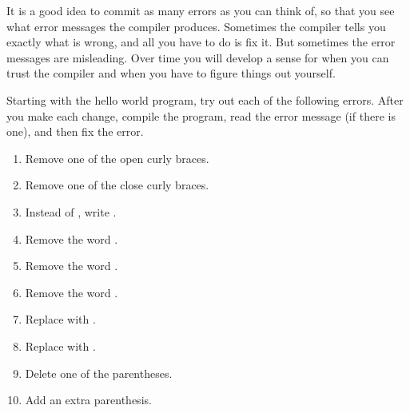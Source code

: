 \begin{exercise}  %

It is a good idea to commit as many errors as you can think of, so that you see what error messages the compiler produces.
Sometimes the compiler tells you exactly what is wrong, and all you have to do is fix it.
But sometimes the error messages are misleading.
Over time you will develop a sense for when you can trust the compiler and when you have to figure things out yourself.

Starting with the hello world program, try out each of the following errors.
After you make each change, compile the program, read the error message (if there is one), and then fix the error.

\begin{enumerate}
\item Remove one of the open curly braces.
\item Remove one of the close curly braces.
\item Instead of , write .
\item Remove the word .
\item Remove the word .
\item Remove the word .
\item Replace  with .
\item Replace  with .
\item Delete one of the parentheses.
\item Add an extra parenthesis.
\end{enumerate}

\end{exercise}
